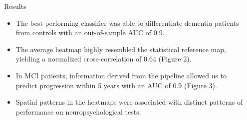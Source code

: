 \documentclass[final,11pt]{beamer}
\begin{document}
\begin{frame}[t]
\begin{columns}[t]
\begin{column}{.3\textwidth}
            \end{column}
            \begin{column}{.3\textwidth}
                \begin{block}{Results}
                    \parbox{\textwidth}{\justify
                        \begin{itemize}[leftmargin=0em,labelindent=\parindent]
                            \item[\textbullet] The best performing classifier was able to differentiate dementia patients from controls with an out-of-sample AUC of 0.9.
                            \item[\textbullet] The average heatmap highly resembled the statistical reference map, yielding a normalized cross-correlation of 0.64 (Figure 2).
                            \item[\textbullet] In MCI patients, information derived from the pipeline allowed us to predict progression within 5 years with an AUC of 0.9 (Figure 3).
                            \item[\textbullet] Spatial patterns in the heatmaps were associated with distinct patterns of performance on neuropsychological tests.
                        \end{itemize}
                        \vspace{0.6cm}
                        
                    }
                \end{block}
            \end{column}
        \end{columns}


\end{frame}
\end{document}
